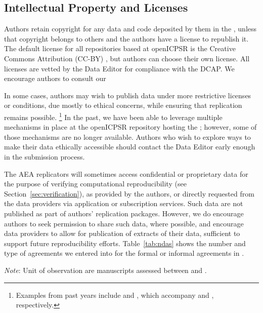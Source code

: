 \subsection{Intellectual Property and Licenses} 
\label{sec:ip}

Authors retain  copyright for any data and code deposited by them in the \aeadcr{}, unless that copyright belongs to others and the authors have a license to republish it. The default license for all repositories based at openICPSR is the  Creative Commons Attribution (CC-BY) \citep{CreativeCommons2017}, but authors can choose their own license. All  licenses  are vetted by the Data Editor for compliance with the \ac{DCAP}. We encourage authors to consult our  

In some cases, authors may wish to publish data under more restrictive licenses or conditions, due  mostly to ethical concerns, while ensuring that replication remains possible.%
\footnote{Examples from past years include \citet{deryugina2021data} and \citet{goncalves2021data}, which accompany \citet{deryugina_covid-19_2021} and \citet{goncalves_few_2021}, respectively.}
In the past, we have been able to leverage multiple mechanisms in place at the openICPSR repository hosting the \aeadcr{}; however, some of those mechanisms are no longer available. Authors who wish to explore ways to make their data ethically accessible should contact the Data Editor early enough in the submission process. 

The AEA replicators will sometimes access confidential or proprietary data for the purpose of verifying computational reproducibility (see Section~\ref{sec:verification}), as provided by the authors, or directly requested from the data providers via application or subscription services. Such data are not published as part of authors' replication packages. However, we do encourage authors to seek permission to share such data, where possible, and encourage data providers to allow for publication of extracts of their data, sufficient to support future reproducibility efforts. Table~\ref{tab:ndas} shows the number and type of agreements we entered into for the \mcpubnda{} formal or informal agreements in \reportyear{}.

\begin{minipage}{\columnwidth}
\begin{center}
    \label{tab:ndas}
     \begin{threeparttable}
     
    \begin{tablenotes}
    \footnotesize
    \item[] \textit{Note}: Unit of observation are manuscripts assessed between \firstday{} and \lastday{}. 
    \end{tablenotes}
    \end{threeparttable}
\end{center}
\vspace{0.3cm}
\end{minipage}

